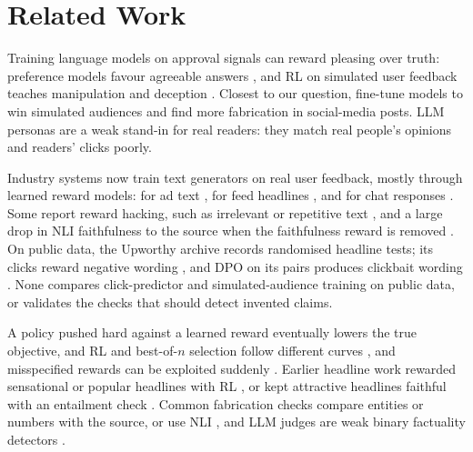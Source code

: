 \section{Related Work}
Training language models on approval signals can reward pleasing over truth: preference models favour agreeable answers \citep{sharma2024sycophancy}, and RL on simulated user feedback teaches manipulation and deception \citep{williams2025targeted}. Closest to our question, \citet{elzou2025moloch} fine-tune models to win simulated audiences and find more fabrication in social-media posts. LLM personas are a weak stand-in for real readers: they match real people's opinions \citep{santurkar2023whose} and readers' clicks \citep{maiorano2026personas} poorly.

Industry systems now train text generators on real user feedback, mostly through learned reward models: for ad text \citep{jiang2025rlpf,chen2025ctrad,wang2025diver}, for feed headlines \citep{chen2026gese}, and for chat responses \citep{han2025rluf}. Some report reward hacking, such as irrelevant or repetitive text \citep{jiang2025rlpf,han2025rluf}, and a large drop in NLI faithfulness to the source when the faithfulness reward is removed \citep{chen2026gese}. On public data, the Upworthy archive \citep{matias2021upworthy} records randomised headline tests; its clicks reward negative wording \citep{robertson2023negativity,gligoric2023linguistic}, and DPO on its pairs produces clickbait wording \citep{wangsudhir2026whyitworks}. None compares click-predictor and simulated-audience training on public data, or validates the checks that should detect invented claims.

A policy pushed hard against a learned reward eventually lowers the true objective, and RL and best-of-$n$ selection follow different curves \citep{gao2023scaling}, and misspecified rewards can be exploited suddenly \citep{pan2022misspecification}. Earlier headline work rewarded sensational or popular headlines with RL \citep{xu2019clickbait,song2020attractive}, or kept attractive headlines faithful with an entailment check \citep{chen2023honestbait}. Common fabrication checks compare entities \citep{nan2021entity} or numbers \citep{zhao2020quantity} with the source, or use NLI \citep{maynez2020faithfulness,laban2022summac}, and LLM judges are weak binary factuality detectors \citep{tang2024tofueval}.
